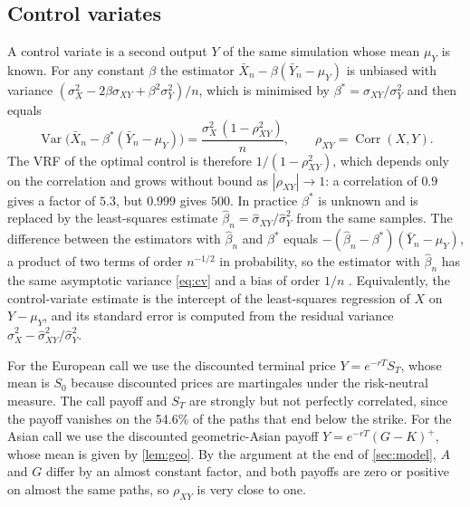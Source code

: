 \documentclass[11pt,a4paper]{article}
\newcommand{\Var}{\operatorname{Var}}
\newcommand{\Corr}{\operatorname{Corr}}
\begin{document}
\subsection{Control variates}\label{sec:cv}

A control variate is a second output $Y$ of the same simulation whose mean $\mu_Y$ is known.
For any constant $\beta$ the estimator $\bar X_n - \beta(\bar Y_n-\mu_Y)$ is unbiased with variance $(\sigma_X^2 - 2\beta\sigma_{XY} + \beta^2\sigma_Y^2)/n$, which is minimised by $\beta^* = \sigma_{XY}/\sigma_Y^2$ and then equals
\begin{equation}\label{eq:cv}
\Var\big(\bar X_n - \beta^*(\bar Y_n-\mu_Y)\big) = \frac{\sigma_X^2\,(1-\rho_{XY}^2)}{n},\qquad \rho_{XY} = \Corr(X,Y).
\end{equation}
The VRF of the optimal control is therefore $1/(1-\rho_{XY}^2)$, which depends only on the correlation and grows without bound as $|\rho_{XY}|\to1$: a correlation of $0.9$ gives a factor of $5.3$, but $0.999$ gives $500$.
In practice $\beta^*$ is unknown and is replaced by the least-squares estimate $\hat\beta_n = \hat\sigma_{XY}/\hat\sigma_Y^2$ from the same samples.
The difference between the estimators with $\hat\beta_n$ and $\beta^*$ equals $-(\hat\beta_n-\beta^*)(\bar Y_n-\mu_Y)$, a product of two terms of order $n^{-1/2}$ in probability, so the estimator with $\hat\beta_n$ has the same asymptotic variance \cref{eq:cv} and a bias of order $1/n$ \citep{lavenberg1981,glasserman2004}.
Equivalently, the control-variate estimate is the intercept of the least-squares regression of $X$ on $Y-\mu_Y$, and its standard error is computed from the residual variance $\hat\sigma_X^2 - \hat\sigma_{XY}^2/\hat\sigma_Y^2$.

For the European call we use the discounted terminal price $Y = e^{-rT}S_T$, whose mean is $S_0$ because discounted prices are martingales under the risk-neutral measure.
The call payoff and $S_T$ are strongly but not perfectly correlated, since the payoff vanishes on the 54.6\% of the paths that end below the strike.
For the Asian call we use the discounted geometric-Asian payoff $Y = e^{-rT}(G-K)^+$, whose mean is given by \cref{lem:geo}.
By the argument at the end of \cref{sec:model}, $A$ and $G$ differ by an almost constant factor, and both payoffs are zero or positive on almost the same paths, so $\rho_{XY}$ is very close to one.
\end{document}
